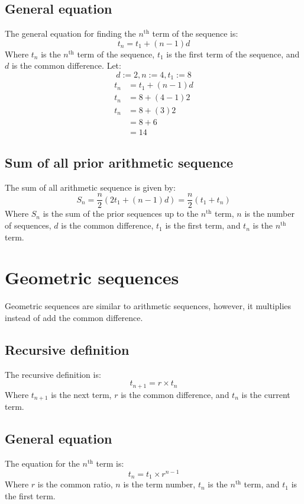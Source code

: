 \documentclass{book}
\newenvironment{generalInformation}{}{}
\newenvironment{explanationOfTerms}{}{}
\newenvironment{example}{}{}
\begin{document}
\subsection{General equation}
\begin{generalInformation}
	The general equation for finding the $n^{\text{th}}$ term of the sequence is:
\end{generalInformation}
\[
	t_n = t_1 + (n - 1)d
\]
\begin{explanationOfTerms}
	Where $t_n$ is the $n^{\text{th}}$ term of the sequence, $t_1$ is the first term of the sequence, and $d$ is the common difference.
\end{explanationOfTerms}
\begin{example}
	Let:
	\[
		d := 2, n := 4, t_1 := 8
	\]
	\begin{align*}
		t_n & = t_1 + (n - 1)d \\
		t_n & = 8 + (4 - 1)2   \\
		t_n & = 8 + (3)2       \\
		    & = 8 + 6          \\
		    & = 14
	\end{align*}
\end{example}

\subsection{Sum of all prior arithmetic sequence}
The sum of all arithmetic sequence is given by:
\[
	S_n = \frac{n}{2}(2t_1 + (n - 1)d) = \frac{n}{2}(t_1 + t_n)
\]
Where $S_n$ is the sum of the prior sequences up to the $n^{\text{th}}$ term, $n$ is the number of sequences, $d$ is the common difference, $t_1$ is the first term, and $t_n$ is the $n^{\text{th}}$ term.

\section{Geometric sequences}
Geometric sequences are similar to arithmetic sequences, however, it multiplies instead of add the common difference.
\subsection{Recursive definition}
The recursive definition is:
\[
	t_{n + 1} = r \times t_n
\]
Where $t_{n + 1}$ is the next term, $r$ is the common difference, and $t_n$ is the current term.

\subsection{General equation}
The equation for the $n^{\text{th}}$ term is:
\[
	t_n = t_1 \times r^{n - 1}
\]
Where $r$ is the common ratio, $n$ is the term number, $t_n$ is the $n^{\text{th}}$ term, and $t_1$ is the first term.
\end{document}
